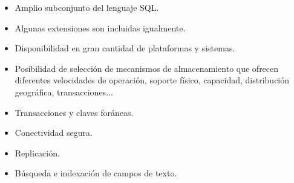 \begin{itemize}
        \begin{itemize}
            \item Amplio subconjunto del lenguaje SQL.
            \item Algunas extensiones son incluidas igualmente.
            \item Disponibilidad en gran cantidad de plataformas y sistemas.
            \item Posibilidad de selección de mecanismos de almacenamiento que ofrecen diferentes velocidades de operación, soporte físico, capacidad, distribución geográfica, transacciones...
            \item Transacciones y claves foráneas.
            \item Conectividad segura.
            \item Replicación.
            \item Búsqueda e indexación de campos de texto.
        \end{itemize}
        
    
\end{itemize}

